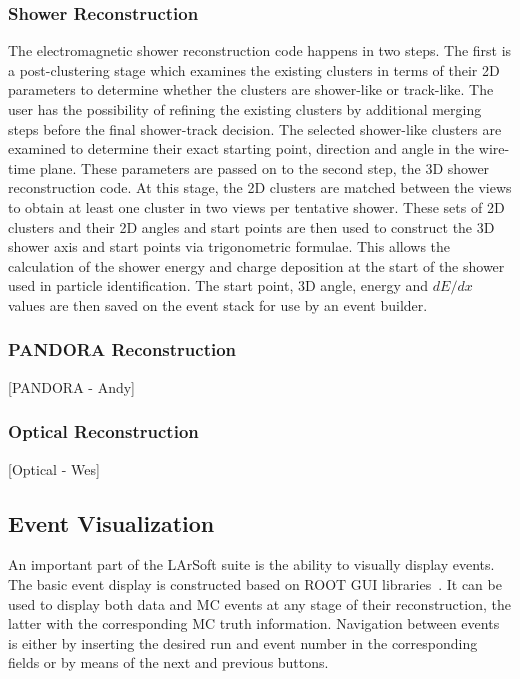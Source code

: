 \documentclass[12pt]{elsarticle}
\newcommand{\larsoft}{LArSoft }
\begin{document}
\subsubsection{Shower Reconstruction}

The electromagnetic shower reconstruction code happens in two steps. The first is a post-clustering stage which examines the existing clusters in terms of their 2D parameters to determine whether the clusters are shower-like or track-like. The user has the possibility of refining the existing clusters by additional merging steps before the final shower-track decision. The selected shower-like clusters are examined to determine their exact starting point, direction and angle in the wire-time plane. These parameters are passed on to the second step, the 3D shower reconstruction code. At this stage, the 2D clusters are matched between the views to obtain at least one cluster in two views per tentative shower. These sets of 2D clusters and their 2D angles and start points are then used to construct the 3D shower axis and start points via trigonometric formulae. This allows the calculation of the shower energy and charge deposition at the start of the shower used in particle identification. The start point, 3D angle, energy and $dE/dx$ values are then saved on the event stack for use by an event builder.

\subsubsection{PANDORA Reconstruction}
[PANDORA - Andy]
\subsubsection{Optical Reconstruction}
[Optical - Wes]

\subsection{Event Visualization}
An important part of the \larsoft suite is the ability to visually display events. The basic event display is constructed based on ROOT GUI libraries~\cite{ROOT}.
It can be used to display both data and MC events at any stage of their reconstruction, the latter with the corresponding MC truth information. 
Navigation between events is either by inserting the desired run and event number in the corresponding fields or by means of the next and previous buttons.
\end{document}

